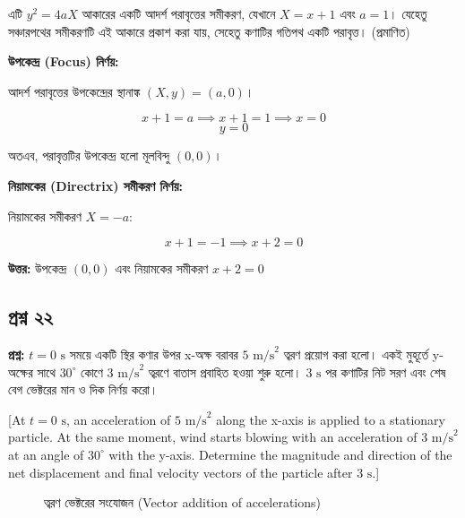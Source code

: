 \documentclass{article}
\begin{document}
এটি $y^2 = 4aX$ আকারের একটি আদর্শ পরাবৃত্তের সমীকরণ, যেখানে $X = x + 1$ এবং $a = 1$। যেহেতু সঞ্চারপথের সমীকরণটি এই আকারে প্রকাশ করা যায়, সেহেতু কণাটির গতিপথ একটি পরাবৃত্ত। (প্রমাণিত)

\textbf{উপকেন্দ্র (Focus) নির্ণয়:}

আদর্শ পরাবৃত্তের উপকেন্দ্রের স্থানাঙ্ক $(X, y) = (a, 0)$।

$$x + 1 = a \implies x + 1 = 1 \implies x = 0$$
$$y = 0$$

অতএব, পরাবৃত্তটির উপকেন্দ্র হলো মূলবিন্দু $(0, 0)$।

\textbf{নিয়ামকের (Directrix) সমীকরণ নির্ণয়:}

নিয়ামকের সমীকরণ $X = -a$:

$$x + 1 = -1 \implies x + 2 = 0$$

\textbf{উত্তর:} উপকেন্দ্র $(0, 0)$ এবং নিয়ামকের সমীকরণ $x + 2 = 0$

\hrulefill

\subsection*{প্রশ্ন ২২}
\textbf{প্রশ্ন:} $t = 0\text{ s}$ সময়ে একটি স্থির কণার উপর x-অক্ষ বরাবর $5\text{ m/s}^2$ ত্বরণ প্রয়োগ করা হলো। একই মুহূর্তে y-অক্ষের সাথে $30^\circ$ কোণে $3\text{ m/s}^2$ ত্বরণে বাতাস প্রবাহিত হওয়া শুরু হলো। $3\text{ s}$ পর কণাটির নিট সরণ এবং শেষ বেগ ভেক্টরের মান ও দিক নির্ণয় করো।

[At $t = 0\text{ s}$, an acceleration of $5\text{ m/s}^2$ along the x-axis is applied to a stationary particle. At the same moment, wind starts blowing with an acceleration of $3\text{ m/s}^2$ at an angle of $30^\circ$ with the y-axis. Determine the magnitude and direction of the net displacement and final velocity vectors of the particle after $3\text{ s}$.]

\begin{figure}[h!]
\centering
{}
\caption{ত্বরণ ভেক্টরের সংযোজন (Vector addition of accelerations)}
\end{figure}
\end{document}
